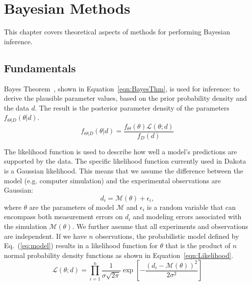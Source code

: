 \chapter{Bayesian Methods}\label{uq:bayes}


This chapter covers theoretical aspects of methods for performing
Bayesian inference.

\section{Fundamentals} \label{uq:bayes:basic}

Bayes Theorem~\cite{Jaynes}, shown in Equation~\ref{eqn:BayesThm}, is
used for inference: to derive the plausible parameter values, based on
the prior probability density and the data $d$. The result is the
posterior parameter density of the parameters $f_{\Theta |D}\left(
{\theta |d} \right)$.
\begin{equation}
  \label{eqn:BayesThm}
  {f_{\Theta |D}}\left( {\theta |d} \right) = \frac{{{f_\Theta }\left( \theta  \right)\mathcal{L}\left( {\theta ;d} \right)}}{{{f_D}\left( d \right)}}
\end{equation}

The likelihood function is used to describe how well a model's
predictions are supported by the data.  
The specific likelihood function currently used in Dakota is a Gaussian
likelihood. This means that we assume the difference between the model
(e.g. computer simulation) and the experimental observations are
Gaussian:
\begin{equation}\label{eq:model}
d_i = \mathcal{M}(\theta) + \epsilon_i,
\end{equation}
where $\theta$ are the parameters of model $\mathcal{M}$ and
$\epsilon_i$ is a random variable that can encompass both measurement
errors on $d_i$ and modeling errors associated with the simulation
$\mathcal{M}(\theta)$. We further assume that all experiments and
observations are independent.  If we have $n$ observations, the
probabilistic model defined by Eq.~(\ref{eq:model}) results in a
likelihood function for $\theta$ that is the product of $n$ normal
probability density functions as shown in
Equation~\ref{eqn:Likelihood}.
\begin{equation}\label{eqn:Likelihood}  
\mathcal{L}({\theta};d) = \prod_{i=1}^n \frac{1}{\sigma \sqrt{2\pi}} \exp
\left[ - \frac{\left(d_i-\mathcal{M}({\theta})\right)^2}{2\sigma^2} \right]
\end{equation}

